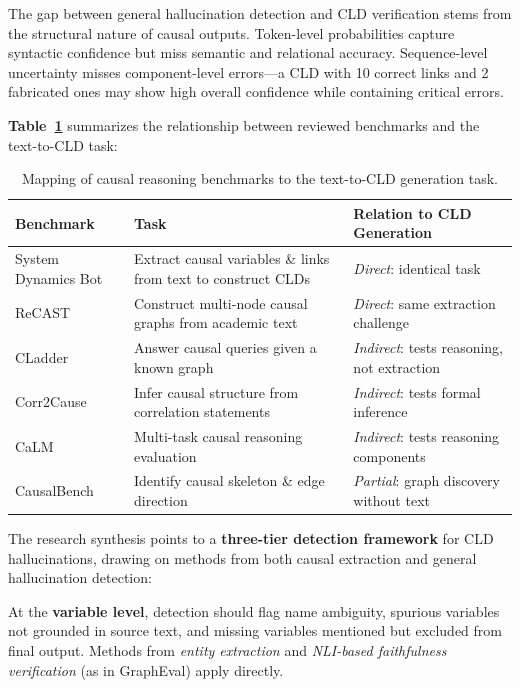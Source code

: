 The gap between general hallucination detection and CLD verification stems from the structural nature of causal outputs. Token-level probabilities capture syntactic confidence but miss semantic and relational accuracy. Sequence-level uncertainty misses component-level errors---a CLD with 10 correct links and 2 fabricated ones may show high overall confidence while containing critical errors.

\textbf{Table~\ref{tab:benchmark_task_mapping}} summarizes the relationship between reviewed benchmarks and the text-to-CLD task:

\begin{table}[h]
\centering
\small
\begin{tabular}{p{2.8cm}p{4.5cm}p{4.5cm}}
\toprule
\textbf{Benchmark} & \textbf{Task} & \textbf{Relation to CLD Generation} \\
\midrule
System Dynamics Bot & Extract causal variables \& links from text to construct CLDs & \textit{Direct}: identical task \\
ReCAST & Construct multi-node causal graphs from academic text & \textit{Direct}: same extraction challenge \\
CLadder & Answer causal queries given a known graph & \textit{Indirect}: tests reasoning, not extraction \\
Corr2Cause & Infer causal structure from correlation statements & \textit{Indirect}: tests formal inference \\
CaLM & Multi-task causal reasoning evaluation & \textit{Indirect}: tests reasoning components \\
CausalBench & Identify causal skeleton \& edge direction & \textit{Partial}: graph discovery without text \\
\bottomrule
\end{tabular}
\caption{Mapping of causal reasoning benchmarks to the text-to-CLD generation task.}
\label{tab:benchmark_task_mapping}
\end{table}

The research synthesis points to a \textbf{three-tier detection framework} for CLD hallucinations, drawing on methods from both causal extraction and general hallucination detection:

At the \textbf{variable level}, detection should flag name ambiguity, spurious variables not grounded in source text, and missing variables mentioned but excluded from final output. Methods from \textit{entity extraction} and \textit{NLI-based faithfulness verification} (as in GraphEval) apply directly.

